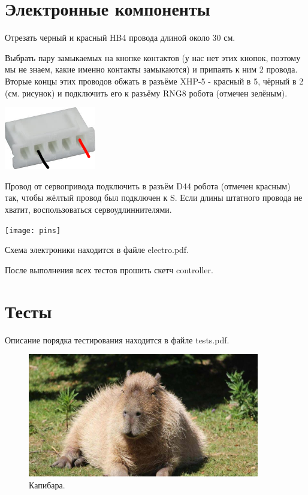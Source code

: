 \documentclass[12pt,a4paper,oneside]{article}
\begin{document}
\section{Электронные компоненты}
Отрезать черный и красный HB4 провода длиной около 30 см.

Выбрать пару замыкаемых на кнопке контактов (у нас нет этих кнопок, поэтому мы
не знаем, какие именно контакты замыкаются) и припаять к ним 2 провода. Вторые
концы этих проводов обжать в разъёме XHP-5 - красный в 5, чёрный в 2 (см.
рисунок) и подключить его к разъёму RNG8 робота (отмечен зелёным).

\includegraphics[width=0.3\textwidth]{buttoncontacts}

Провод от сервопривода подключить в разъём D44 робота (отмечен красным) так,
чтобы жёлтый провод был подключен к S. Если длины штатного провода не хватит,
воспользоваться сервоудлиннителями.

\texttt{[image: pins]}

Схема электроники находится в файле electro.pdf.

После выполнения всех тестов прошить скетч controller.

\section{Тесты}
Описание порядка тестирования находится в файле tests.pdf.

\newpage

\begin{figure}
\centering
\includegraphics[width=0.9\textwidth]{capybara.jpg}
\caption{\label{fig:capybara}Капибара.}
\end{figure}
\end{document}
